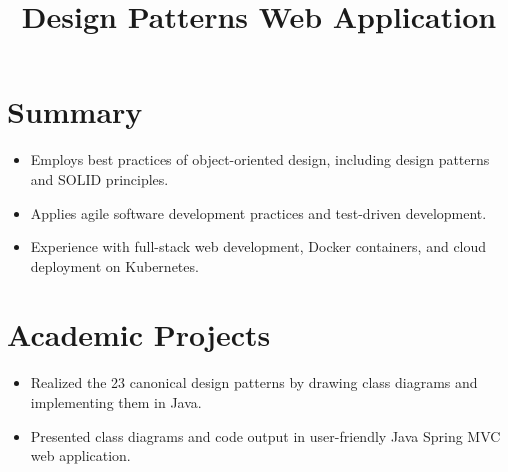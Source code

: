 \documentclass[12pt]{res} %
\begin{document}
    \begin{resume}
 
      \section{Summary}
      \begin{itemize}[leftmargin=-0.4cm, rightmargin=0.8cm]
        \itemsep0em
        \item Employs best practices of object-oriented design, including design patterns and SOLID principles.
        \item Applies agile software development practices and test-driven development.
        \item Experience with full-stack web development, Docker containers, and cloud deployment on Kubernetes.
        \end{itemize}
        \vspace{-10pt}
      
        \section{Academic Projects}
          \vspace{2pt}

          \title{\textbf{Design Patterns Web Application}}
          \begin{position}
            \vspace{-14pt}
            \begin{itemize}[leftmargin=-0.4cm, rightmargin=0.8cm]
            \itemsep0em
            \item Realized the 23 canonical design patterns by drawing class diagrams and implementing them in Java.
            \item Presented class diagrams and code output in user-friendly Java Spring MVC web application.
            \end{itemize}
          \end{position}
          \vspace{-10pt}


\end{resume}
\end{document}
